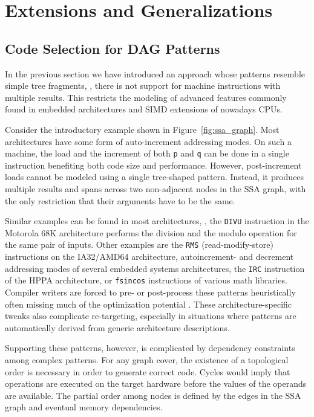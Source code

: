 \section{Extensions and Generalizations}

\subsection{Code Selection for DAG Patterns}
\label{sec:dag_patterns}
In the previous section we have introduced an approach whose
patterns resemble simple tree fragments, \eg, there is not support for
machine instructions with multiple results. This restricts the
modeling of advanced features commonly found in embedded
architectures and SIMD extensions of nowadays CPUs.

Consider the introductory example shown
in Figure~\ref{fig:ssa_graph}. Most architectures have some form of
auto-increment addressing modes. On such a machine, the load and the
increment of both \texttt{p} and \texttt{q} can be done in a single
instruction benefiting both code size and performance. However,
post-increment loads cannot be modeled using a single tree-shaped
pattern. Instead, it produces multiple results and spans across two
non-adjacent nodes in the SSA graph, with the only restriction that
their arguments have to be the same.

Similar examples can be found in most architectures, \eg, the
\texttt{DIVU} instruction in the Motorola 68K architecture performs
the division and the modulo operation for the same pair of
inputs. Other examples are the \texttt{RMS} (read-modify-store)
instructions on the IA32/AMD64 architecture, autoincrement- and
decrement addressing modes of several embedded systems architectures,
the \texttt{IRC} instruction of the HPPA architecture, or
\texttt{fsincos} instructions of various math libraries. Compiler
writers are forced to pre- or post-process these patterns
heuristically often missing much of the optimization potential
\cite{Ebner08}. These architecture-specific tweaks also complicate
re-targeting, especially in situations where patterns are
automatically derived from generic architecture descriptions.

Supporting these patterns, however, is complicated by dependency
constraints among complex patterns. For any graph cover, the existence
of a topological order is necessary in order to generate correct
code. Cycles would imply that operations are executed on the target
hardware before the values of the operands are available. The partial
order among nodes is defined by the edges in the SSA graph and
eventual memory dependencies.

